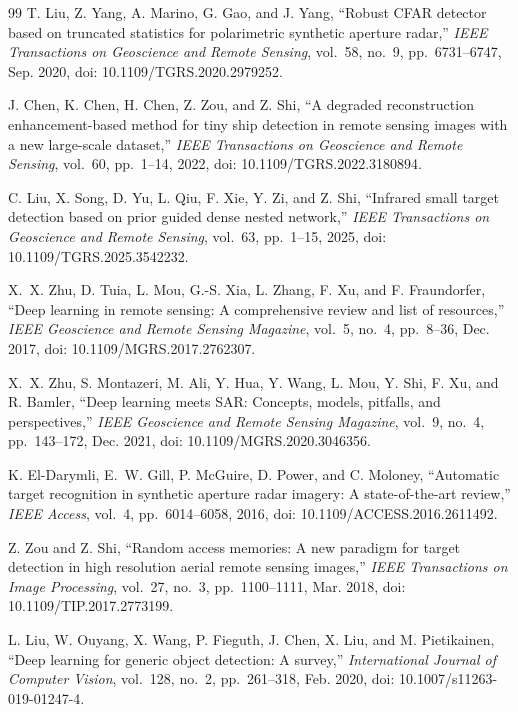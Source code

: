 \documentclass[journal]{IEEEtran}
\begin{document}
\begin{thebibliography}{99}
T. Liu, Z. Yang, A. Marino, G. Gao, and J. Yang, ``Robust CFAR detector based on truncated statistics for polarimetric synthetic aperture radar,'' \emph{IEEE Transactions on Geoscience and Remote Sensing}, vol.~58, no.~9, pp.~6731--6747, Sep. 2020, doi: 10.1109/TGRS.2020.2979252.

J. Chen, K. Chen, H. Chen, Z. Zou, and Z. Shi, ``A degraded reconstruction enhancement-based method for tiny ship detection in remote sensing images with a new large-scale dataset,'' \emph{IEEE Transactions on Geoscience and Remote Sensing}, vol.~60, pp.~1--14, 2022, doi: 10.1109/TGRS.2022.3180894.

C. Liu, X. Song, D. Yu, L. Qiu, F. Xie, Y. Zi, and Z. Shi, ``Infrared small target detection based on prior guided dense nested network,'' \emph{IEEE Transactions on Geoscience and Remote Sensing}, vol.~63, pp.~1--15, 2025, doi: 10.1109/TGRS.2025.3542232.

X.~X. Zhu, D. Tuia, L. Mou, G.-S. Xia, L. Zhang, F. Xu, and F. Fraundorfer, ``Deep learning in remote sensing: A comprehensive review and list of resources,'' \emph{IEEE Geoscience and Remote Sensing Magazine}, vol.~5, no.~4, pp.~8--36, Dec. 2017, doi: 10.1109/MGRS.2017.2762307.

X.~X. Zhu, S. Montazeri, M. Ali, Y. Hua, Y. Wang, L. Mou, Y. Shi, F. Xu, and R. Bamler, ``Deep learning meets SAR: Concepts, models, pitfalls, and perspectives,'' \emph{IEEE Geoscience and Remote Sensing Magazine}, vol.~9, no.~4, pp.~143--172, Dec. 2021, doi: 10.1109/MGRS.2020.3046356.

K. El-Darymli, E.~W. Gill, P. McGuire, D. Power, and C. Moloney, ``Automatic target recognition in synthetic aperture radar imagery: A state-of-the-art review,'' \emph{IEEE Access}, vol.~4, pp.~6014--6058, 2016, doi: 10.1109/ACCESS.2016.2611492.

Z. Zou and Z. Shi, ``Random access memories: A new paradigm for target detection in high resolution aerial remote sensing images,'' \emph{IEEE Transactions on Image Processing}, vol.~27, no.~3, pp.~1100--1111, Mar. 2018, doi: 10.1109/TIP.2017.2773199.

L. Liu, W. Ouyang, X. Wang, P. Fieguth, J. Chen, X. Liu, and M. Pietikainen, ``Deep learning for generic object detection: A survey,'' \emph{International Journal of Computer Vision}, vol.~128, no.~2, pp.~261--318, Feb. 2020, doi: 10.1007/s11263-019-01247-4.


\end{thebibliography}
\end{document}
